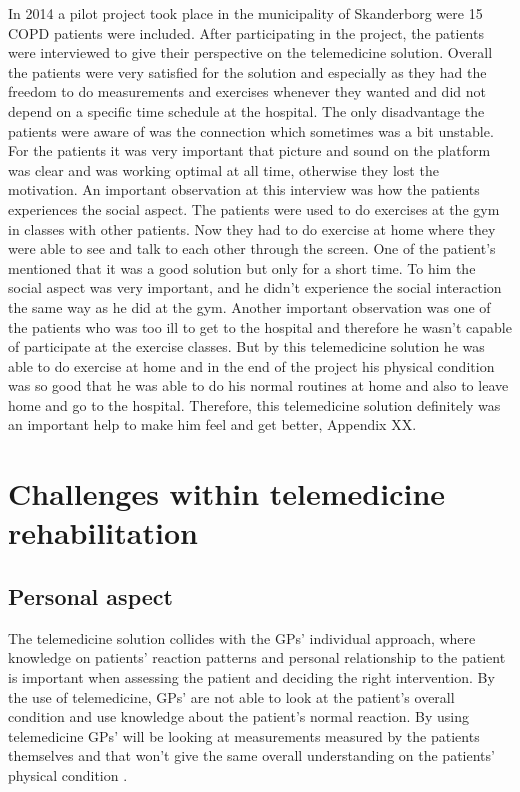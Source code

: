 In 2014 a pilot project took place in the municipality of Skanderborg were 15 COPD patients were included. After participating in the project, the patients were interviewed to give their perspective on the telemedicine solution. Overall the patients were very satisfied for the solution and especially as they had the freedom to do measurements and exercises whenever they wanted and did not depend on a specific time schedule at the hospital. The only disadvantage the patients were aware of was the connection which sometimes was a bit unstable. For the patients it was very important that picture and sound on the platform was clear and was working optimal at all time, otherwise they lost the motivation. An important observation at this interview was how the patients experiences the social aspect. The patients were used to do exercises at the gym in classes with other patients. Now they had to do exercise at home where they were able to see and talk to each other through the screen. One of the patient’s mentioned that it was a good solution but only for a short time. To him the social aspect was very important, and he didn’t experience the social interaction the same way as he did at the gym. Another important observation was one of the patients who was too ill to get to the hospital and therefore he wasn’t capable of participate at the exercise classes. But by this telemedicine solution he was able to do exercise at home and in the end of the project his physical condition was so good that he was able to do his normal routines at home and also to leave home and go to the hospital. Therefore, this telemedicine solution definitely was an important help to make him feel and get better, Appendix XX.  


\section{Challenges within telemedicine rehabilitation} 
\subsection{Personal aspect}
The telemedicine solution collides with the GPs’ individual approach, where knowledge on patients’ reaction patterns and personal relationship to the patient is important when assessing the patient and deciding the right intervention. By the use of telemedicine, GPs’ are not able to look at the patient’s overall condition and use knowledge about the patient’s normal reaction. By using telemedicine GPs’ will be looking at measurements measured by the patients themselves and that won’t give the same overall understanding on the patients’ physical condition \cite{Emergence}.  

